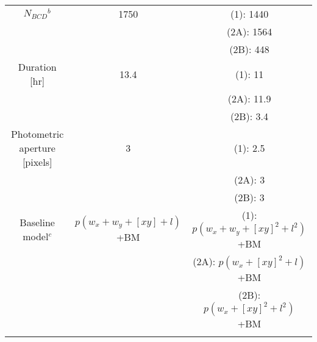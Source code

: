 \documentclass[traditabstract]{aa}
\begin{document}
\begin{appendix}
\begin{table*}
\begin{center}
{\begin{tabular}{ccc}
$N_{BCD}$$^{b}$                                                &   1750                                 & (1): 1440                                     \\ \noalign {\smallskip} 
                                                                           &                                            & (2A):  1564                                     \\ \noalign {\smallskip} 
                                                                            &                                          &  (2B):   448                                          \\ \noalign {\smallskip} 
 Duration  [hr]                                                      & 13.4                                   & (1): 11                                          \\ \noalign {\smallskip}  
                                                                            &                                          & (2A): 11.9                                    \\ \noalign {\smallskip}  
                                                                           &                                          & (2B): 3.4                                       \\ \noalign {\smallskip}  
 Photometric aperture [pixels]                             & 3                                      &  (1): 2.5                                         \\ \noalign {\smallskip}  
                                                                          &                                          & (2A): 3                                          \\ \noalign {\smallskip}  
                                                                           &                                          & (2B): 3                                          \\ \noalign {\smallskip}  
Baseline  model$^{c}$     & $p(w_x +  w_y + [xy] + l) $ +BM         & (1): $p(w_x + w_y + [xy]^2 + l^2) $ +BM            \\ \noalign {\smallskip}     
                                    &                                                                & (2A): $p(w_x + [xy]^2 + l) $ +BM            \\ \noalign {\smallskip}  
                                    &                                                                 & (2B): $p(w_x +  [xy]^2 + l^2) $ +BM            \\ \noalign {\smallskip}                        
$$
\end{tabular}}
\end{center}
\end{table*}
\end{appendix}
\end{document}
